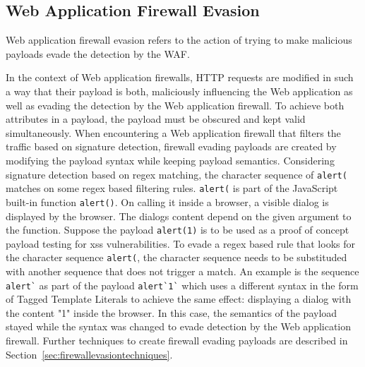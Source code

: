 \subsection{Web Application Firewall Evasion}
Web application firewall evasion refers to the action of trying to make malicious payloads evade the detection by the WAF.

In the context of Web application firewalls, HTTP requests are modified in such a way that their payload is both, maliciously influencing the Web application as well as evading the detection by the Web application firewall. To achieve both attributes in a payload, the payload must be obscured and kept valid simultaneously. When encountering a Web application firewall that filters the traffic based on signature detection, firewall evading payloads are created by modifying the payload syntax while keeping payload semantics. Considering signature detection based on regex matching, the character sequence of \verb|alert(| matches on some regex based filtering rules. \verb|alert(| is part of the JavaScript built-in function \verb|alert()|. On calling it inside a browser, a visible dialog is displayed by the browser. The dialogs content depend on the given argument to the function. \cite{js/alert}
Suppose the payload \verb|alert(1)| is to be used as a proof of concept payload testing for \gls{xss} vulnerabilities.
To evade a regex based rule that looks for the character sequence \verb|alert(|, the character sequence needs to be substituded with another sequence that does not trigger a match. An example is the sequence \verb|alert`| as part of the payload \verb|alert`1`| which uses a different syntax in the form of Tagged Template Literals to achieve the same effect: displaying a dialog with the content "1" inside the browser.
In this case, the semantics of the payload stayed while the syntax was changed to evade detection by the Web application firewall.
Further techniques to create firewall evading payloads are described in Section~\ref{sec:firewallevasiontechniques}.

